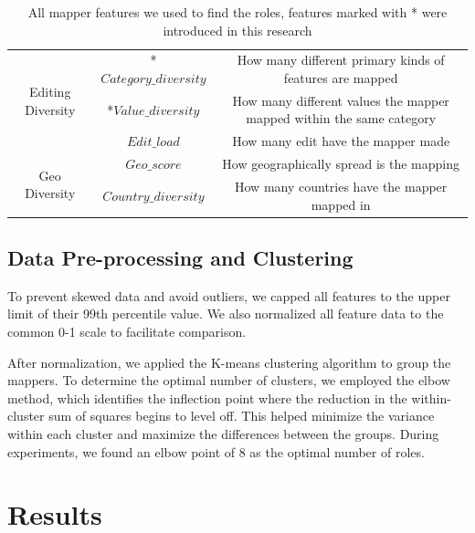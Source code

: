 \documentclass[manuscript,screen,review]{acmart}
\begin{document}
\begin{table}[h!]
\begin{tabular}{ccc}
\multirow{3}{*}{Editing Diversity} & *$Category\_diversity$  & How many different primary kinds of features are mapped                                           \\ \cline{2-3} 
                                   & *$Value\_diversity$ & How many different values the mapper mapped within the same category                                              \\ \cline{2-3} 
                                   & $Edit\_load$                & How many edit have the mapper made                                                                \\ \hline
\multirow{2}{*}{Geo Diversity}     & $Geo\_score$                & How geographically spread is the mapping                                                          \\ \cline{2-3} 
                                   & $Country\_diversity$        & How many countries have the mapper mapped in                                                              \\ \hline
\end{tabular}
\caption{All mapper features we used to find the roles, features marked with * were introduced in this research}
\label{mapper-feature}
\end{table}

\subsection{Data Pre-processing and Clustering}

To prevent skewed data and avoid outliers, we capped all features to the upper limit of their 99th percentile value. We also normalized all feature data to the common 0-1 scale to facilitate comparison.

After normalization, we applied the K-means clustering algorithm to group the mappers. To determine the optimal number of clusters, we employed the elbow method, which identifies the inflection point where the reduction in the within-cluster sum of squares begins to level off. This helped minimize the variance within each cluster and maximize the differences between the groups. During experiments, we found an elbow point of 8 as the optimal number of roles.

\section{Results}
\end{document}
